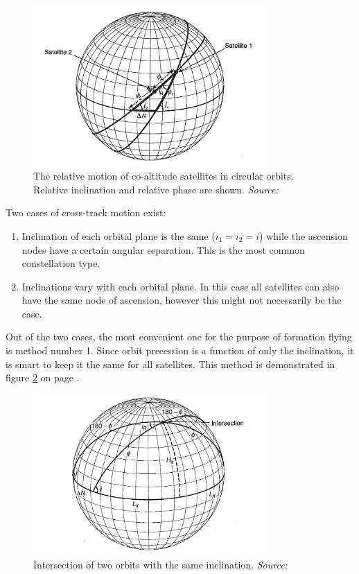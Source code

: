 \begin{figure}[ht!]
\centering
\includegraphics[width=0.8\textwidth, angle=0]{chapters/img/relativeMotion.png}

\caption{The relative motion of co-altitude satellites in circular orbits. Relative inclination and relative phase are shown. \emph{Source: \cite{constDesign}}}
\label{fig:relativeMotion}
\end{figure}

Two cases of cross-track motion exist: 

\begin{enumerate}
	\item Inclination of each orbital plane is the same ($i_1 = i_2 = i$) while the ascension nodes have a certain angular separation. This is the most common constellation type.
	\item Inclinations vary with each orbital plane. In this case all satellites can also have the same node of ascension, however this might not necessarily be the case.
\end{enumerate}

Out of the two cases, the most convenient one for the purpose of formation flying is method number 1. Since orbit precession is a function of only the inclination, it is smart to keep it the same for all satellites. This method is demonstrated in figure \ref{fig:intersection} on page \pageref{fig:intersection}.

\begin{figure}[ht!]
\centering
\includegraphics[width=0.8\textwidth, angle=0]{chapters/img/intersection.png}

\caption{Intersection of two orbits with the same inclination. \emph{Source: \cite{constDesign}}}
\label{fig:intersection}
\end{figure}

